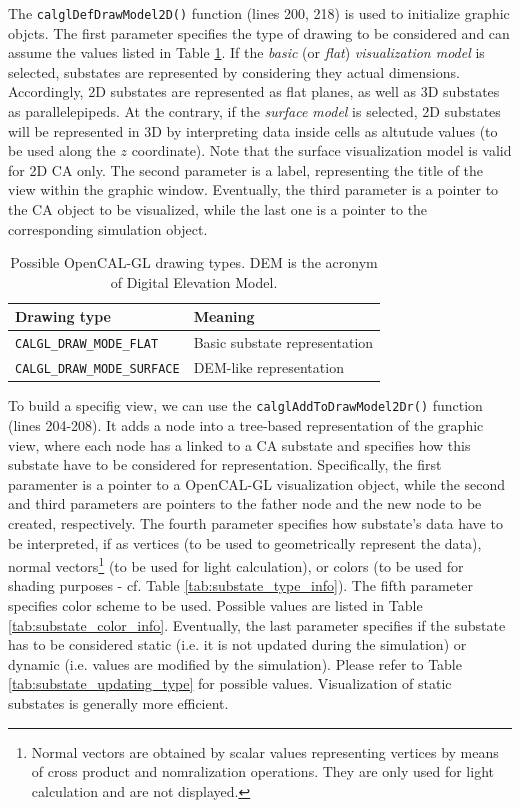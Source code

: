 The \verb'calglDefDrawModel2D()' function (lines 200, 218) is used to
initialize graphic objcts. The first parameter specifies the type of
drawing to be considered and can assume the values listed in Table
\ref{tab:draw_modes}. If the \emph{basic} (or \emph{flat})
\emph{visualization model} is selected, substates are represented by
considering they actual dimensions. Accordingly, 2D substates are
represented as flat planes, as well as 3D substates as
parallelepipeds. At the contrary, if the \emph{surface model} is
selected, 2D substates will be represented in 3D by interpreting data
inside cells as altutude values (to be used along the $z$
coordinate). Note that the surface visualization model is valid for 2D
CA only. The second parameter is a label, representing the title of the
view within the graphic window. Eventually, the third parameter is a
pointer to the CA object to be visualized, while the last one is a
pointer to the corresponding simulation object.

\begin{table}
  \centering
  \footnotesize
  \begin{tabular}{l|l}
    \hline
    Drawing type & Meaning \\
    \hline
    \hline
    \verb'CALGL_DRAW_MODE_FLAT'    & Basic substate representation \\
    \verb'CALGL_DRAW_MODE_SURFACE' & DEM-like representation \\
    \hline
  \end{tabular}
  \caption{Possible OpenCAL-GL drawing types. DEM is the acronym of Digital Elevation Model.}
  \label{tab:draw_modes}
\end{table} 

To build a specifig view, we can use the
\verb'calglAddToDrawModel2Dr()' function (lines 204-208). It adds a
node into a tree-based representation of the graphic view, where each
node has a linked to a CA substate and specifies how this substate
have to be considered for representation. Specifically, the first
paramenter is a pointer to a OpenCAL-GL visualization object, while
the second and third parameters are pointers to the father node and
the new node to be created, respectively. The fourth parameter
specifies how substate's data have to be interpreted, if as vertices
(to be used to geometrically represent the data), normal
vectors\footnote{Normal vectors are obtained by scalar values
  representing vertices by means of cross product and nomralization
  operations. They are only used for light calculation and are not
  displayed.} (to be used for light calculation), or colors (to be
used for shading purposes - cf. Table
\ref{tab:substate_type_info}). The fifth parameter specifies color
scheme to be used. Possible values are listed in Table
\ref{tab:substate_color_info}. Eventually, the last parameter
specifies if the substate has to be considered static (i.e. it is not
updated during the simulation) or dynamic (i.e. values are modified by
the simulation). Please refer to Table
\ref{tab:substate_updating_type} for possible values. Visualization of
static substates is generally more efficient.

